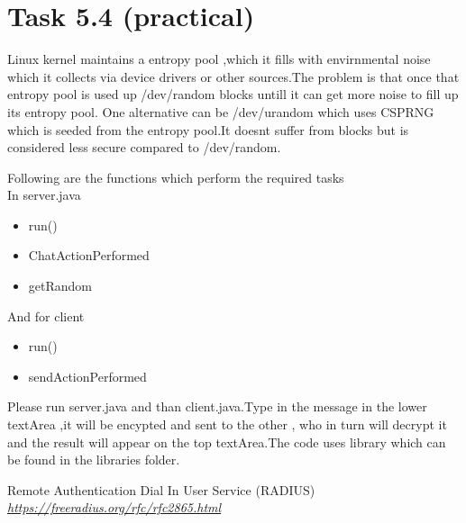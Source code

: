 \documentclass{article}
\begin{document}
\section *{Task 5.4 (practical)}
Linux kernel maintains a entropy pool ,which it fills with envirnmental noise which it collects via device drivers or other sources.The problem is that once that entropy pool is used up /dev/random blocks untill it can get more noise to fill up its entropy pool.
One alternative can be /dev/urandom which uses CSPRNG which is seeded from the entropy pool.It doesnt suffer from blocks but is considered less secure compared to /dev/random.

Following are the functions which perform the required tasks\\
In server.java
\begin{itemize}
\item run() 
\item ChatActionPerformed 
\item getRandom 
\end{itemize}
And for client
\begin{itemize}
\item run()\\
\item sendActionPerformed\\
\end{itemize}

Please run server.java and than client.java.Type in the message in the lower textArea ,it will be encypted and sent to the other , who in turn will decrypt it and the result will appear on the top textArea.The code uses library which can be found in the libraries folder.

\begin{thebibliography}{9}

  Remote Authentication Dial In User Service (RADIUS)
  \emph{\url{https://freeradius.org/rfc/rfc2865.html}}
    
\end{thebibliography}
\end{document}
